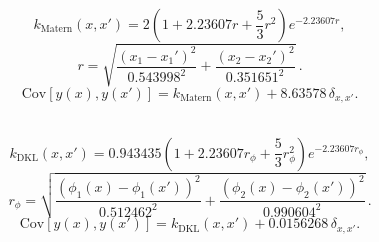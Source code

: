 
$$k_{\mathrm{Matern}}(x,x') = 2 \left(1 + 2.23607 r + \frac{5}{3} r^2\right) e^{-2.23607 r},$$
$$r = \sqrt{\frac{(x_1 - x_1')^2}{0.543998^2} + \frac{(x_2 - x_2')^2}{0.351651^2}}\,.$$
$$\mathrm{Cov}[y(x),y(x')] = k_{\mathrm{Matern}}(x,x') + 8.63578\,\delta_{x,x'}. $$
\

$$k_{\mathrm{DKL}}(x,x') = 0.943435 \left(1 + 2.23607 r_\phi + \frac{5}{3} r_\phi^2\right) e^{-2.23607 r_\phi},$$
$$r_\phi = \sqrt{\frac{(\phi_1(x)-\phi_1(x'))^2}{0.512462^2} + \frac{(\phi_2(x)-\phi_2(x'))^2}{0.990604^2}}\,.$$
$$\mathrm{Cov}[y(x),y(x')] = k_{\mathrm{DKL}}(x,x') + 0.0156268\,\delta_{x,x'}. $$